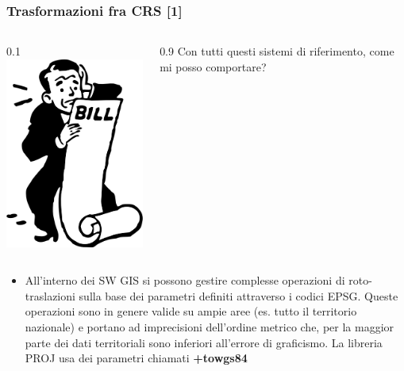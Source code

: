 \documentclass{beamer}
\begin{document}
{\begin{frame}
\frametitle{Trasformazioni fra CRS [1]}
 \begin{columns}	
	\begin{column} {0.1\textwidth}
			\includegraphics[width=1\textwidth] {./pics/worried-bill.png}
	\end{column}
	\begin{column} {0.9\textwidth}
		Con tutti questi sistemi di riferimento, come mi posso comportare?
	\end{column}
\end{columns}
\begin{itemize}
	\item All'interno dei SW GIS si possono gestire complesse operazioni di roto-traslazioni sulla base dei parametri definiti attraverso i codici EPSG. Queste operazioni sono in genere valide su ampie aree (es. tutto il territorio nazionale) e portano ad imprecisioni dell'ordine metrico che, per la maggior parte dei dati territoriali sono inferiori all’errore di graficismo. La libreria PROJ usa dei parametri chiamati \textbf{+towgs84}

\end{itemize}
\end{frame}}
\end{document}
